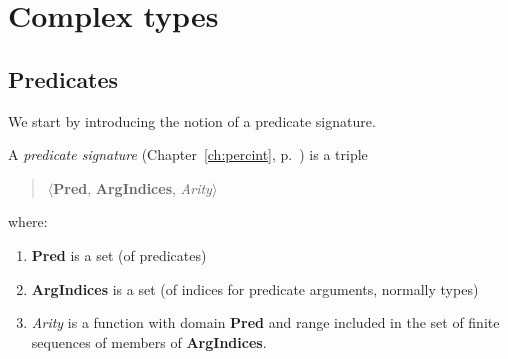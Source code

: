  


 

\section{Complex types}

\subsection{Predicates}
\label{app:predicates}
We start by introducing the notion of a predicate signature.

A \textit{predicate signature} (Chapter~\ref{ch:percint}, p.~\pageref{ex:pred-sig})
is a triple
\begin{quote}
$\langle$\textbf{Pred}, \textbf{ArgIndices}, \textit{Arity}$\rangle$
\end{quote}
where:
\begin{enumerate} 
 
\item \textbf{Pred} is a set (of predicates)

\item \textbf{ArgIndices} is a set (of indices for predicate
  arguments, normally types)
 
\item \textit{Arity} is a function with domain \textbf{Pred} and range
  included in the set of finite sequences of members of \textbf{ArgIndices}. 
 
\end{enumerate}

